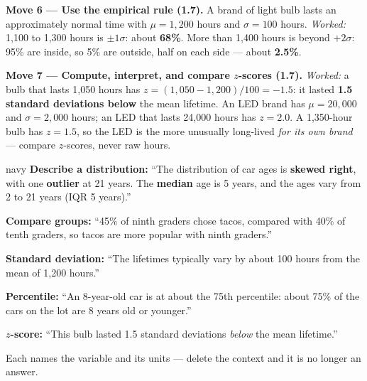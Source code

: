 \documentclass[12pt]{article}
\begin{document}
\vspace{3pt}
\textbf{Move 6 --- Use the empirical rule (1.7).} A brand of light bulb lasts an approximately
normal time with $\mu = 1{,}200$ hours and $\sigma = 100$ hours. \emph{Worked:} 1,100 to 1,300
hours is $\pm 1\sigma$: about \textbf{68\%}. More than 1,400 hours is beyond $+2\sigma$: 95\% are
inside, so 5\% are outside, half on each side --- about \textbf{2.5\%}.

\vspace{4pt}
{\centering
{}\par}

\vspace{3pt}
\textbf{Move 7 --- Compute, interpret, and compare $z$-scores (1.7).} \emph{Worked:} a bulb that
lasts 1,050 hours has $z = (1{,}050 - 1{,}200)/100 = -1.5$: it lasted \textbf{1.5 standard
deviations below} the mean lifetime. An LED brand has $\mu = 20{,}000$ and $\sigma = 2{,}000$ hours;
an LED that lasts 24,000 hours has $z = 2.0$. A 1,350-hour bulb has $z = 1.5$, so the LED is
the more unusually long-lived \emph{for its own brand} --- compare $z$-scores, never raw hours.
\normalsize

\vspace{0.10in}
\boxguard[20]
\begin{scenariobox}{navy}
\small
\textbf{Describe a distribution:} ``The distribution of car ages is \textbf{skewed right}, with
one \textbf{outlier} at 21 years. The \textbf{median} age is 5 years, and the ages vary from 2 to
21 years (IQR 5 years).''\par\vspace{3pt}
\textbf{Compare groups:} ``45\% of ninth graders chose tacos, compared with 40\% of tenth
graders, so tacos are more popular with ninth graders.''\par\vspace{3pt}
\textbf{Standard deviation:} ``The lifetimes typically vary by about 100 hours from the mean of
1,200 hours.''\par\vspace{3pt}
\textbf{Percentile:} ``An 8-year-old car is at about the 75th percentile: about 75\% of the cars on
the lot are 8 years old or younger.''\par\vspace{3pt}
\textbf{$z$-score:} ``This bulb lasted 1.5 standard deviations \emph{below} the mean
lifetime.''\par\vspace{3pt}
Each names the variable and its units --- delete the context and it is no longer an answer.
\end{scenariobox}
\end{document}
